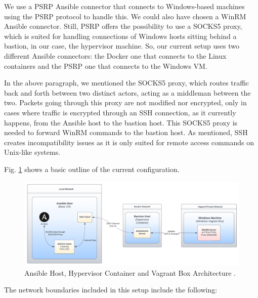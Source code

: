 We use a PSRP Ansible connector that connects to Windows-based machines using the PSRP protocol to handle this. We could also have chosen a WinRM Ansible connector. Still, PSRP offers the possibility to use a SOCKS5 proxy, which is suited for handling connections of Windows hosts sitting behind a bastion, in our case, the hypervisor machine. So, our current setup uses two different Ansible connectors: the Docker one that connects to the Linux containers and the PSRP one that connects to the Windows VM.

In the above paragraph, we mentioned the SOCKS5 proxy, which routes traffic back and forth between two distinct actors, acting as a middleman between the two. Packets going through this proxy are not modified nor encrypted, only in cases where traffic is encrypted through an SSH connection, as it currently happens, from the Ansible host to the bastion host. This SOCKS5 proxy is needed to forward WinRM commands to the bastion host. As mentioned, SSH creates incompatibility issues as it is only suited for remote access commands on Unix-like systems.

Fig. \ref{fig:vagrant_kvm_host} shows a basic outline of the current configuration.

\begin{figure}[H]
    \includegraphics[width=13cm]{figures/vagrant_kvm_setup.pdf}
    \caption{Ansible Host, Hypervisor Container and Vagrant Box Architecture \cite{vagrant_kvm_host_ref}.}
    \label{fig:vagrant_kvm_host}
\end{figure}

The network boundaries included in this setup include the following:

